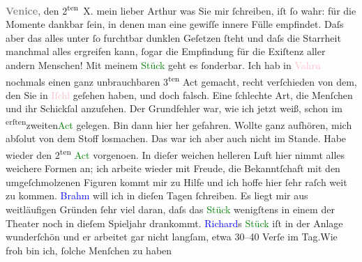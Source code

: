            \pstart
           \raggedleft{}\textcolor{gray}{\textbf{Venice}}, den 2\textsuperscript{ten} X.\pend
           \pstart{}mein lieber Arthur\pend\pstart
           was Sie mir ſchreiben, iſt ſo wahr: für die Momente dankbar ſein, in denen man eine
               gewiſſe innere Fülle empfindet. Daſs aber das alles unter ſo furchtbar dunklen
               Geſetzen ſteht und daſs die Starrheit manchmal alles ergreifen {\pb}kann, ſogar die Empfindung für die
               Exiſtenz aller andern Menschen!\pend
           \pstart
           Mit meinem \textcolor{green}{Stück}{} geht es
               ſonderbar. Ich hab in \textcolor{pink}{Vahrn}{}\ledrightnote{\textcolor{pink}{Vahrn}} nochmals einen ganz
               unbrauchbaren 3\textsuperscript{ten} Act gemacht, recht verſchieden von
               dem, den Sie in \textcolor{pink}{Iſchl}{}\ledrightnote{\textcolor{pink}{Bad Ischl}} geſehen haben, und doch
               falsch. Eine ſchlechte Art, die Menſchen und ihr Schickſal anzuſehen. Der Grundfehler
               war, wie ich jetzt weiß, schon im \substVorne{}\textsuperscript{erſten}{\allowbreak}\substDazwischen{}zweiten\substHinten{}{ }\textcolor{green}{Act}{} gelegen. Bin dann hier her gefahren. Wollte ganz
               aufhören, mich abſolut von dem Stoff losmachen. Das war ich aber auch nicht im
               Stande. Habe wieder den 2\textsuperscript{ten}{ }\textcolor{green}{Act}{} vorgeno{\geminationm}en. In dieſer weichen helleren Luft hier {\pb}nimmt alles weichere Formen an;
               ich arbeite wieder mit Freude, die Bekanntſchaft mit den umgeſchmolzenen Figuren
               kommt mir zu Hilfe und ich hoffe hier ſehr raſch weit zu kommen.\pend
           \pstart
           \textcolor{blue}{Brahm}{}\ledrightnote{\textcolor{blue}{Otto Brahm}} will ich in dieſen Tagen ſchreiben. Es
               liegt mir aus weitläufigen Gründen ſehr viel daran, daſs das \textcolor{green}{Stück}{} wenigſtens in einem der Theater noch in
               dieſem Spieljahr drankommt.\pend
           \pstart
           \textcolor{blue}{Richard}{}\ledrightnote{\textcolor{blue}{Richard Beer-Hofmann}}s \textcolor{green}{Stück}{} iſt in der Anlage wunderſchön und er arbeitet gar
               nicht langſam, etwa 30–40 Verſe {\pb}im Tag.\hspace*{1.5em}Wie froh bin ich, ſolche Menſchen zu haben
